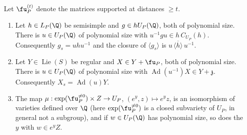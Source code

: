 \begin{lemma}\label{lem:iter}
Let $\fu_P^{(t)}$ denote the matrices supported at distances $\ge t$.
\begin{enumerate}
\item Let $h\in L_P(\Q)$ be semisimple and $g\in hU_P(\Q)$, both of polynomial size. There is
$u\in U_P(\Q)$ of polynomial size with $u^{-1}gu\in h\,C_{U_P}(h)$. Consequently $g_s=uhu^{-1}$ and the
closure of $\langle g_s\rangle$ is $u\,\overline{\langle h\rangle}\,u^{-1}$.
\item Let $Y\in\operatorname{Lie}(S)$ be regular and $X\in Y+\fu_P$, both of polynomial size. There is
$u\in U_P(\Q)$ of polynomial size with $\operatorname{Ad}(u^{-1})X\in Y+\mathfrak z$. Consequently
$X_s=\operatorname{Ad}(u)Y$.
\item The map $\mu:\exp(\fu_P^{\ne0})\times Z\to U_P$, $(e^y,z)\mapsto e^yz$, is an isomorphism of
varieties defined over $\Q$ (here $\exp(\fu_P^{\ne0})$ is a closed subvariety of $U_P$, in general not a
subgroup), and if $w\in U_P(\Q)$ has polynomial size, so does the $y$ with
$w\in e^yZ$.
\end{enumerate}
\end{lemma}
